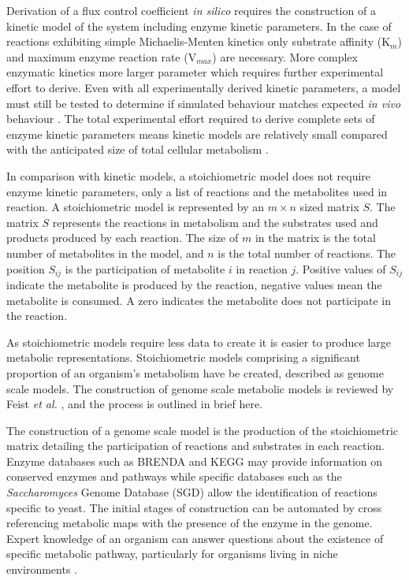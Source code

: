 Derivation of a flux control coefficient \emph{in silico} requires the construction of a kinetic model of the system including enzyme kinetic parameters. In the case of reactions exhibiting simple Michaelis-Menten kinetics only substrate affinity (K$_{m}$) and maximum enzyme reaction rate (V$_{max}$) are necessary. More complex enzymatic kinetics more larger parameter which requires further experimental effort to derive. Even with all experimentally derived kinetic parameters, a model must still be tested to determine if simulated behaviour matches expected \emph{in vivo} behaviour \cite{teusink2000}. The total experimental effort required to derive complete sets of enzyme kinetic parameters means kinetic models are relatively small compared with the anticipated size of total cellular metabolism \cite{steuer2007}.

In comparison with kinetic models, a stoichiometric model does not require enzyme kinetic parameters, only a list of reactions and the metabolites used in reaction. A stoichiometric model is represented by an $m \times n$ sized matrix $S$. The matrix $S$ represents the reactions in metabolism and the substrates used and products produced by each reaction. The size of $m$ in the matrix is the total number of metabolites in the model, and $n$ is the total number of reactions. The position $S_{ij}$ is the participation of metabolite $i$ in reaction $j$. Positive values of $S_{ij}$ indicate the metabolite is produced by the reaction, negative values mean the metabolite is consumed. A zero indicates the metabolite does not participate in the reaction.

As stoichiometric models require less data to create it is easier to produce large metabolic representations. Stoichiometric models comprising a significant proportion of an organism's metabolism have be created, described as genome scale models. The construction of genome scale metabolic models is reviewed by Feist \emph{et al.} \cite{feist2009}, and the process is outlined in brief here.

The construction of a genome scale model is the production of the stoichiometric matrix detailing the participation of reactions and substrates in each reaction. Enzyme databases such as BRENDA \cite{chang2009} and KEGG \cite{okuda2008} may provide information on conserved enzymes and pathways while specific databases such as the \emph{Saccharomyces} Genome Database (SGD) \cite{cherry1997} allow the identification of reactions specific to yeast. The initial stages of construction can be automated by cross referencing metabolic maps with the presence of the enzyme in the genome. Expert knowledge of an organism can answer questions about the existence of specific metabolic pathway, particularly for organisms living in niche environments \cite{sun2009}.

